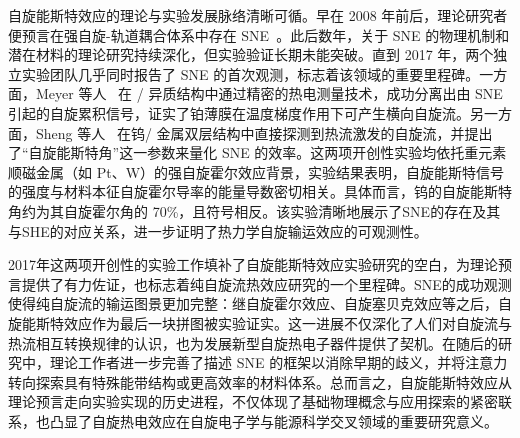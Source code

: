 自旋能斯特效应的理论与实验发展脉络清晰可循。早在 2008 年前后，理论研究者便预言在强自旋-轨道耦合体系中存在 SNE~\cite{sheng2017Spin}。此后数年，关于 SNE 的物理机制和潜在材料的理论研究持续深化，但实验验证长期未能突破。直到 2017 年，两个独立实验团队几乎同时报告了 SNE 的首次观测，标志着该领域的重要里程碑。一方面，Meyer 等人~\cite{meyer2017Observationb} 在 / 异质结构中通过精密的热电测量技术，成功分离出由 SNE 引起的自旋累积信号，证实了铂薄膜在温度梯度作用下可产生横向自旋流。另一方面，Sheng 等人~\cite{sheng2017Spin} 在钨/ 金属双层结构中直接探测到热流激发的自旋流，并提出了“自旋能斯特角”这一参数来量化 SNE 的效率。这两项开创性实验均依托重元素顺磁金属（如 Pt、W）的强自旋霍尔效应背景，实验结果表明，自旋能斯特信号的强度与材料本征自旋霍尔导率的能量导数密切相关。具体而言，钨的自旋能斯特角约为其自旋霍尔角的 70\%，且符号相反。该实验清晰地展示了SNE的存在及其与SHE的对应关系，进一步证明了热力学自旋输运效应的可观测性。

2017年这两项开创性的实验工作填补了自旋能斯特效应实验研究的空白，为理论预言提供了有力佐证，也标志着纯自旋流热效应研究的一个里程碑。SNE的成功观测使得纯自旋流的输运图景更加完整：继自旋霍尔效应、自旋塞贝克效应等之后，自旋能斯特效应作为最后一块拼图被实验证实。这一进展不仅深化了人们对自旋流与热流相互转换规律的认识，也为发展新型自旋热电子器件提供了契机。在随后的研究中，理论工作者进一步完善了描述 SNE 的框架以消除早期的歧义，并将注意力转向探索具有特殊能带结构或更高效率的材料体系。总而言之，自旋能斯特效应从理论预言走向实验实现的历史进程，不仅体现了基础物理概念与应用探索的紧密联系，也凸显了自旋热电效应在自旋电子学与能源科学交叉领域的重要研究意义。


